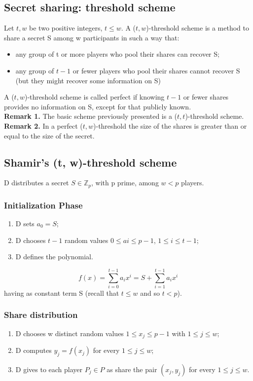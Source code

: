 \documentclass[a4paper, 10pt, titlepage]{article}
\begin{document}
\subsection{Secret sharing: threshold scheme}
Let $t, w$ be two positive integers, $t \leq w$. A ($t,w$)-threshold scheme is a method to share a secret S among w participants in such a way that:
\begin{itemize}
\item any group of t or more players who pool their shares can recover S;
\item any group of $t - 1$ or fewer players who pool their shares cannot recover S (but they might recover some information on S)
\end{itemize}
A ($t,w$)-threshold scheme is called perfect if knowing $t-1$ or fewer shares provides no information on S, except for that publicly known. \medskip\\
\textbf{Remark 1.} The basic scheme previously presented is a ($t,t$)-threshold scheme. \\
\textbf{Remark 2.} In a perfect ($t,w$)-threshold the size of the shares is greater than or equal to the size of the secret.

\subsection{Shamir's (t, w)-threshold scheme}
D distributes a secret $S \in \mathbb{Z}_p$, with p prime, among $w < p$ players.
\subsubsection*{Initialization Phase}
\begin{enumerate}
\item D sets $a_0 = S$;
\item D chooses $t - 1$ random values $0 \leq ai \leq p - 1$, $1 \leq i \leq t - 1$;
\item D defines the polynomial.
\end{enumerate}
$$f(x) = \sum_{i=0}^{t-1} a_ix^i = S + \sum_{i=1}^{t-1}a_ix^i$$
having as constant term S (recall that $t \leq w$ and so $t < p$).
\subsubsection*{Share distribution}
\begin{enumerate}
\item D chooses w distinct random values $1 \leq x_j \leq p - 1$ with 
$1 \leq j \leq w$;
\item D computes $y_j = f (x_j)$ for every $1 \leq j \leq w$;
\item D gives to each player $P_j \in P$ as share the pair $(x_j, y_j)$ for every $1 \leq j \leq w$.
\end{enumerate}
\end{document}
